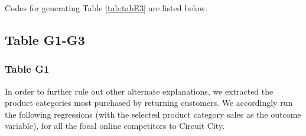 \documentclass{article}
\begin{document}
Codes for generating Table \ref{tab:tabE3} are listed below.

\pagebreak

\subsection{Table G1-G3}
\subsubsection{Table G1}
In order to further rule out other alternate
explanations, we extracted the product categories most purchased by returning customers. We accordingly run the following regressions (with the selected product category sales as the outcome
variable), for all the focal online competitors to Circuit City.\\
\end{document}
